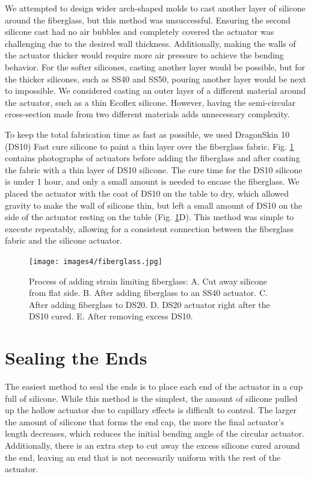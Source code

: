 We attempted to design wider arch-shaped molds to cast another layer of silicone around the fiberglass, but this method was unsuccessful. Ensuring the second silicone cast had no air bubbles and completely covered the actuator was challenging due to the desired wall thickness. Additionally, making the walls of the actuator thicker would require more air pressure to achieve the bending behavior. For the softer silicones, casting another layer would be possible, but for the thicker silicones, such as SS40 and SS50, pouring another layer would be next to impossible. We considered casting an outer layer of a different material around the actuator, such as a thin Ecoflex silicone. However, having the semi-circular cross-section made from two different materials adds unnecessary complexity. 

To keep the total fabrication time as fast as possible, we used DragonSkin 10 (DS10) Fast cure silicone to paint a thin layer over the fiberglass fabric. Fig. \ref{fig:fiberglass} contains photographs of actuators before adding the fiberglass and after coating the fabric with a thin layer of DS10 silicone. The cure time for the DS10 silicone is under 1 hour, and only a small amount is needed to encase the fiberglass. We placed the actuator with the coat of DS10 on the table to dry, which allowed gravity to make the wall of silicone thin, but left a small amount of DS10 on the side of the actuator resting on the table (Fig. \ref{fig:fiberglass}D). This method was simple to execute repeatably, allowing for a consistent connection between the fiberglass fabric and the silicone actuator. 

\begin{figure}[ht!]
    \centering
    \texttt{[image: images4/fiberglass.jpg]}
    \caption{Process of adding strain limiting fiberglass: A. Cut away silicone from flat side. B. After adding fiberglass to an SS40 actuator. C. After adding fiberglass to DS20. D. DS20 actuator right after the DS10 cured. E. After removing excess DS10.}
    \label{fig:fiberglass}
\end{figure}

\clearpage
\section{Sealing the Ends}

The easiest method to seal the ends is to place each end of the actuator in a cup full of silicone. While this method is the simplest, the amount of silicone pulled up the hollow actuator due to capillary effects is difficult to control. The larger the amount of silicone that forms the end cap, the more the final actuator's length decreases, which reduces the initial bending angle of the circular actuator. Additionally, there is an extra step to cut away the excess silicone cured around the end, leaving an end that is not necessarily uniform with the rest of the actuator. 

